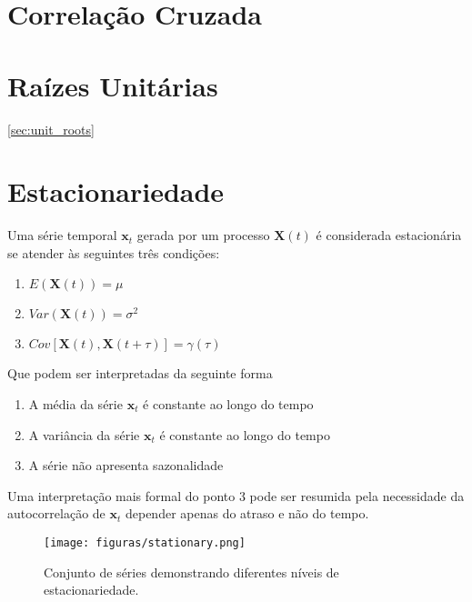 \section{Correlação Cruzada}

\section{Raízes Unitárias}\ref{sec:unit_roots}

\section{Estacionariedade}\label{sec:stationarity}

Uma série temporal $\mathbf{x}_t$ gerada por um processo $\mathbf{X}(t)$ é
considerada estacionária se atender às seguintes três condições:

\begin{enumerate}
    \item $E(\mathbf{X}(t)) = \mu$
    \item $Var(\mathbf{X}(t)) = \sigma^2$
    \item $Cov[\mathbf{X}(t), \mathbf{X}(t+\tau)] = \gamma(\tau)$
\end{enumerate}\vspace{.5cm}

Que podem ser interpretadas da seguinte forma

\begin{enumerate}
    \item A média da série $\mathbf{x}_t$ é constante ao longo do tempo
    \item A variância da série $\mathbf{x}_t$ é constante ao longo do tempo
    \item A série não apresenta sazonalidade
\end{enumerate}\vspace{.5cm}

Uma interpretação mais formal do ponto 3 pode ser resumida pela necessidade  da
autocorrelação de $\mathbf{x}_t$ depender apenas do atraso e não do tempo.

\begin{figure}[h]
    \centering
    \texttt{[image: figuras/stationary.png]}
    \caption{Conjunto de séries demonstrando diferentes níveis de
    estacionariedade.}
    \label{fig:stationarity}
\end{figure}


